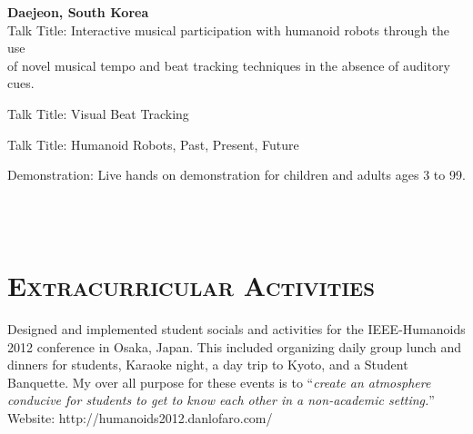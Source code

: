 \begin{resume}
\begin{position}
\textbf{Daejeon, South Korea}\\
Talk Title: Interactive musical participation with humanoid robots through the use\\
of novel musical tempo and beat tracking techniques in the absence of auditory cues.
\end{position}



\begin{position}
Talk Title: Visual Beat Tracking
\end{position}



\begin{position}
Talk Title: Humanoid Robots, Past, Present, Future
\end{position}


\begin{position}
Demonstration: Live hands on demonstration for children and adults ages 3 to 99.
\end{position}







\begin{formatb}
  \\
  \body\\
\end{formatb}

\section{\textsc{Extracurricular Activities}}

\begin{position}
Designed and implemented student socials and activities for the IEEE-Humanoids 2012 conference in Osaka, Japan.  
This included organizing daily group lunch and dinners for students, Karaoke night, a day trip to Kyoto, and a Student Banquette.
My over all purpose for these events is to ``\textit{create an atmosphere conducive for students to get to know each other in a non-academic setting.}''
Website: http://humanoids2012.danlofaro.com/


\end{position}
\end{resume}
